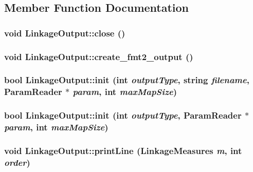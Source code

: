 \subsection{Member Function Documentation}
\hypertarget{classLinkageOutput_a26276f1a377014bd7a4cd851397daca2}{
\subsubsection[{close}]{\setlength{\rightskip}{0pt plus 5cm}void LinkageOutput::close ()}}
\label{classLinkageOutput_a26276f1a377014bd7a4cd851397daca2}
\hypertarget{classLinkageOutput_a2b5c651367922b51027f2ceae3244dc2}{
\subsubsection[{create\_\-fmt2\_\-output}]{\setlength{\rightskip}{0pt plus 5cm}void LinkageOutput::create\_\-fmt2\_\-output ()}}
\label{classLinkageOutput_a2b5c651367922b51027f2ceae3244dc2}
\hypertarget{classLinkageOutput_a656d4a5dec84bb23f3bbf98aef753f12}{
\subsubsection[{init}]{\setlength{\rightskip}{0pt plus 5cm}bool LinkageOutput::init (int {\em outputType}, \/  string {\em filename}, \/  {\bf ParamReader} $\ast$ {\em param}, \/  int {\em maxMapSize})}}
\label{classLinkageOutput_a656d4a5dec84bb23f3bbf98aef753f12}
\hypertarget{classLinkageOutput_a5ede81b8e05550065e1914183c3333dc}{
\subsubsection[{init}]{\setlength{\rightskip}{0pt plus 5cm}bool LinkageOutput::init (int {\em outputType}, \/  {\bf ParamReader} $\ast$ {\em param}, \/  int {\em maxMapSize})}}
\label{classLinkageOutput_a5ede81b8e05550065e1914183c3333dc}
\hypertarget{classLinkageOutput_aac04c2920f8bde831a448e49f1ac170f}{
\subsubsection[{printLine}]{\setlength{\rightskip}{0pt plus 5cm}void LinkageOutput::printLine ({\bf LinkageMeasures} {\em m}, \/  int {\em order})}}
\label{classLinkageOutput_aac04c2920f8bde831a448e49f1ac170f}



